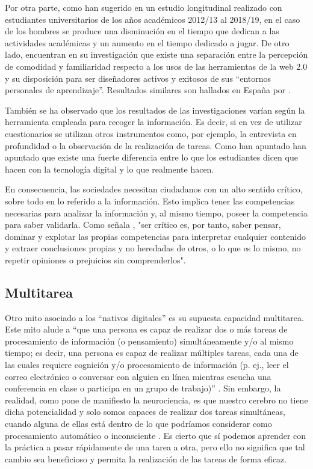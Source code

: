 \documentclass[spanish]{textolivre}
\begin{document}
Por otra parte, como han sugerido \textcite{ordonez2021competencias} en un estudio longitudinal realizado con estudiantes universitarios de los años académicos 2012/13 al 2018/19, en el caso de los hombres se produce una disminución en el tiempo que dedican a las actividades académicas y un aumento en el tiempo dedicado a jugar. De otro lado, \textcite{lim_preservice_2020} encuentran en su investigación que existe una separación entre la percepción de comodidad y familiaridad respecto a los usos de las herramientas de la web 2.0 y su disposición para ser diseñadores activos y exitosos de sus “entornos personales de aprendizaje”. Resultados similares son hallados en España por \textcite{prendes_personal_2017, prendes2019university}. 

También se ha observado que los resultados de las investigaciones varían según la herramienta empleada para recoger la información. Es decir, si en vez de utilizar cuestionarios se utilizan otros instrumentos como, por ejemplo, la entrevista en profundidad o la observación de la realización de tareas. Como han apuntado \textcite{lim_preservice_2020} han apuntado que existe una fuerte diferencia entre lo que los estudiantes dicen que hacen con la tecnología digital y lo que realmente hacen.

En consecuencia, las sociedades necesitan ciudadanos con un alto sentido crítico, sobre todo en lo referido a la información. Esto implica tener las competencias necesarias para analizar la información y, al mismo tiempo, poseer la competencia para saber validarla. Como señala \textcite[p. 21]{perez-escoda_competencia_2021}, "ser crítico es, por tanto, saber pensar, dominar y explotar las propias competencias para interpretar cualquier contenido y extraer conclusiones propias y no heredadas de otros, o lo que es lo mismo, no repetir opiniones o prejuicios sin comprenderlos".

\subsection{Multitarea}

Otro mito asociado a los “nativos digitales” es su supuesta capacidad multitarea. Este mito alude a “que una persona es capaz de realizar dos o más tareas de procesamiento de información (o pensamiento) simultáneamente y/o al mismo tiempo; es decir, una persona es capaz de realizar múltiples tareas, cada una de las cuales requiere cognición y/o procesamiento de información (p. ej., leer el correo electrónico o conversar con alguien en línea mientras escucha una conferencia en clase o participa en un grupo de trabajo)” \cite[p. 138]{kirschner_myths_2017}. Sin embargo, la realidad, como pone de manifiesto la neurociencia, es que nuestro cerebro no tiene dicha potencialidad y solo somos capaces de realizar dos tareas simultáneas, cuando alguna de ellas está dentro de lo que podríamos considerar como procesamiento automático o inconsciente \cite{sousa2014neurociencia}. Es cierto que sí podemos aprender con la práctica a pasar rápidamente de una tarea a otra, pero ello no significa que tal cambio sea beneficioso y permita la realización de las tareas de forma eficaz.
\end{document}
